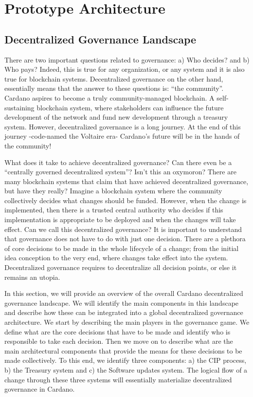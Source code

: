 \section{Prototype Architecture} \label{prototype_architecture}

\subsection{Decentralized Governance Landscape} 
\label{decentralized_governance_landscape}
There are two important questions related to governance: a) Who decides? and b) 
Who pays? Indeed, 
this is true for any organization, or any system and it is also true for 
blockchain systems. Decentralized governance on the other hand, essentially 
means that the answer to these questions is: “the community”. Cardano aspires 
to become a truly community-managed blockchain. A self-sustaining blockchain 
system, where stakeholders can influence the future development of the network 
and fund new development through a treasury system. However, decentralized 
governance is a long journey. At the end of this journey -code-named the 
Voltaire era- Cardano's future will be in the hands of the community! 

What does it take to achieve decentralized governance? Can there even be a 
“centrally governed decentralized system”? Isn't this an oxymoron? There are 
many blockchain systems that claim that have achieved decentralized governance, 
but have they really? Imagine a blockchain system where the community 
collectively decides what changes should be funded. However, when the change is 
implemented, then there is a trusted central authority who decides if this 
implementation is appropriate to be deployed and when the changes will take 
effect. Can we call this decentralized governance? It is important to 
understand that governance does not have to do with just one decision. There 
are a plethora of core decisions to be made in the whole lifecycle of a change; 
from the initial idea conception to the very end, where changes take effect 
into the system. Decentralized governance requires to decentralize all decision 
points, or else it remains an utopia. 

In this section, we will provide an overview of the overall Cardano 
decentralized governance landscape. We will identify the main components in 
this landscape and describe how these can be integrated into a global 
decentralized governance architecture.  We start by describing the main players 
in the governance game. We define what are the core decisions that have to be 
made and identify who is responsible to take each decision.  Then we move on to 
describe what are the main architectural components that provide the means for 
these decisions to be made collectively. To this end, we identify three 
components: a) the CIP process, b) the Treasury system and c) the Software 
updates system. The logical flow of a change through these three systems will 
essentially materialize decentralized governance in Cardano.

